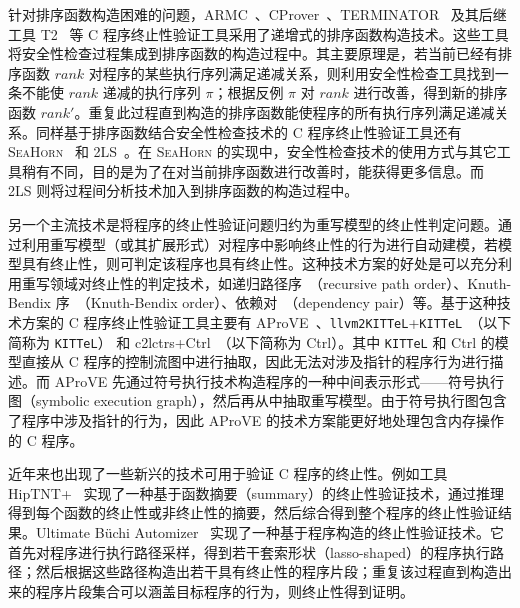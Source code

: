 针对排序函数构造困难的问题，ARMC~\cite{DBLP:conf/padl/PodelskiR07}、CProver~\cite{DBLP:conf/cav/KroeningSTW10,DBLP:conf/tacas/TsitovichSWK11}、TERMINATOR~\cite{DBLP:conf/pldi/CookPR06} 及其后继工具 T2~\cite{DBLP:conf/tacas/BrockschmidtCIK16} 等 C 程序终止性验证工具采用了递增式的排序函数构造技术。这些工具将安全性检查过程集成到排序函数的构造过程中。其主要原理是，若当前已经有排序函数 $rank$ 对程序的某些执行序列满足递减关系，则利用安全性检查工具找到一条不能使 $rank$ 递减的执行序列 $\pi$；根据反例 $\pi$ 对 $rank$ 进行改善，得到新的排序函数 $rank'$。重复此过程直到构造的排序函数能使程序的所有执行序列满足递减关系。同样基于排序函数结合安全性检查技术的 C 程序终止性验证工具还有 \textsc{SeaHorn}~\cite{DBLP:conf/tacas/UrbanGK16} 和 2LS~\cite{DBLP:conf/kbse/ChenDKSW15}。在 \textsc{SeaHorn} 的实现中，安全性检查技术的使用方式与其它工具稍有不同，目的是为了在对当前排序函数进行改善时，能获得更多信息。而 2LS 则将过程间分析技术加入到排序函数的构造过程中。 
 
另一个主流技术是将程序的终止性验证问题归约为重写模型的终止性判定问题。通过利用重写模型（或其扩展形式）对程序中影响终止性的行为进行自动建模，若模型具有终止性，则可判定该程序也具有终止性。这种技术方案的好处是可以充分利用重写领域对终止性的判定技术，如递归路径序~\cite{DBLP:journals/jsc/Dershowitz87}（recursive path order）、Knuth-Bendix 序~\cite{knuth1983simple}（Knuth-Bendix order）、依赖对~\cite{DBLP:journals/tcs/ArtsG00,DBLP:journals/jsc/GieslAO02}（dependency pair）等。基于这种技术方案的 C 程序终止性验证工具主要有 AProVE~\cite{DBLP:conf/rta/GieslTSF04,DBLP:conf/cade/GieslBEFFOPSSST14}、\verb|llvm2KITTeL|+\verb|KITTeL|~\cite{DBLP:conf/rta/FalkeKS11}（以下简称为 \verb|KITTeL|） 和 c2lctrs+Ctrl~\cite{DBLP:conf/lpar/Kop015,KN15}（以下简称为 Ctrl）。其中 \verb|KITTeL| 和 Ctrl 的模型直接从 C 程序的控制流图中进行抽取，因此无法对涉及指针的程序行为进行描述。而 AProVE 先通过符号执行技术构造程序的一种中间表示形式——符号执行图（symbolic execution graph），然后再从中抽取重写模型。由于符号执行图包含了程序中涉及指针的行为，因此 AProVE 的技术方案能更好地处理包含内存操作的 C 程序。

近年来也出现了一些新兴的技术可用于验证 C 程序的终止性。例如工具 HipTNT+~\cite{DBLP:conf/pldi/LeQC15} 实现了一种基于函数摘要（summary）的终止性验证技术，通过推理得到每个函数的终止性或非终止性的摘要，然后综合得到整个程序的终止性验证结果。Ultimate B\"uchi Automizer~\cite{DBLP:conf/cav/HeizmannHP14} 实现了一种基于程序构造的终止性验证技术。它首先对程序进行执行路径采样，得到若干套索形状（lasso-shaped）的程序执行路径；然后根据这些路径构造出若干具有终止性的程序片段；重复该过程直到构造出来的程序片段集合可以涵盖目标程序的行为，则终止性得到证明。

